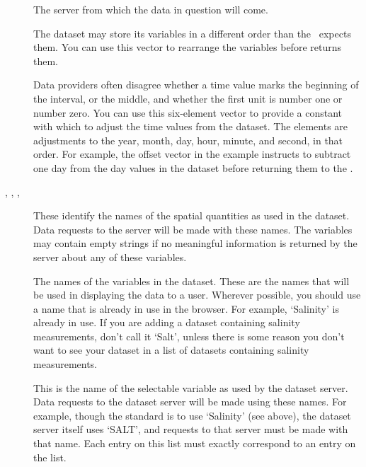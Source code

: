 \begin{description}
  
\item[] The server from which the data in question will
  come.
  
\item[] The dataset may store its variables in a
  different order than the \GUI\ expects them.  You can use this
  vector to rearrange the variables before  returns
  them.
    
\item[] Data providers often disagree whether a time
  value marks the beginning of the interval, or the middle, and
  whether the first unit is number one or number zero.  You can use
  this six-element vector to provide a constant with which to adjust
  the time values from the dataset.  The elements are adjustments to
  the year, month, day, hour, minute, and second, in that order.  For
  example, the offset vector in the example instructs 
  to subtract one day from the day values in the dataset before
  returning them to the \GUI.

\item[, , ,
    ] These identify the names of the spatial
  quantities as used in the dataset.  Data requests to the \opendap server
  will be made with these names.  The variables may contain empty
  strings if no meaningful information is returned by the server about
  any of these variables.
  
\item[] The names of the variables in the
  dataset. These are the names that will be used in displaying the
  data to a user.  Wherever possible, you should use a name that is
  already in use in the browser.  For example, `Salinity' is already
  in use.  If you are adding a dataset containing salinity
  measurements, don't call it `Salt', unless there is some reason you
  don't want to see your dataset in a list of datasets containing
  salinity measurements.
  
\item[] This is the name of the selectable variable as
  used by the dataset server.  Data requests to the dataset server
  will be made using these names.  For example, though the \opendap
  standard is to use `Salinity' (see above), the dataset server itself
  uses `SALT', and requests to that server must be made with that
  name.  Each entry on this list must exactly correspond to an entry
  on the  list.
  

\end{description}
